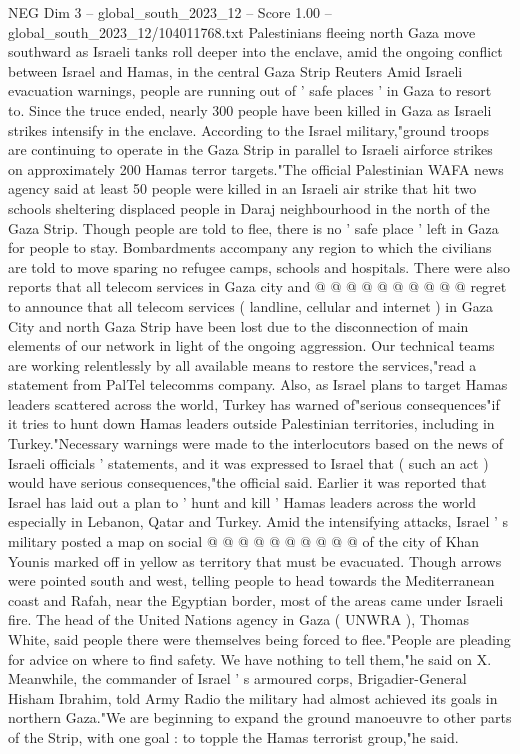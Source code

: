 \begin{textsample}{NEG Dim 3 – global\_south\_2023\_12 – Score 1.00 – global\_south\_2023\_12/104011768.txt}  \label{ex:f3_neg_014}
Palestinians fleeing north Gaza move southward as Israeli tanks roll deeper into the enclave, amid the ongoing conflict between Israel and Hamas, in the central Gaza Strip Reuters Amid Israeli evacuation warnings, people are running out of ' safe places ' in Gaza to resort to.
Since the truce ended, nearly 300 people have been killed in Gaza as Israeli strikes intensify in the enclave.
According to the Israel military,"ground troops are continuing to operate in the Gaza Strip in parallel to Israeli airforce strikes on approximately 200 Hamas terror targets."The official Palestinian WAFA news agency said at least 50 people were killed in an Israeli air strike that hit two schools sheltering displaced people in Daraj neighbourhood in the north of the Gaza Strip.
Though people are told to flee, there is no ' safe place ' left in Gaza for people to stay.
Bombardments accompany any region to which the civilians are told to move sparing no refugee camps, schools and hospitals.
There were also reports that all telecom services in Gaza city and @ @ @ @ @ @ @ @ @ @ regret to announce that all telecom services ( landline, cellular and internet ) in Gaza City and north Gaza Strip have been lost due to the disconnection of main elements of our network in light of the ongoing aggression.
Our technical teams are working relentlessly by all available means to restore the services,"read a statement from PalTel telecomms company.
Also, as Israel plans to target Hamas leaders scattered across the world, Turkey has warned of"serious consequences"if it tries to hunt down Hamas leaders outside Palestinian territories, including in Turkey."Necessary warnings were made to the interlocutors based on the news of Israeli officials ' statements, and it was expressed to Israel that ( such an act ) would have serious consequences,"the official said.
Earlier it was reported that Israel has laid out a plan to ' hunt and kill ' Hamas leaders across the world especially in Lebanon, Qatar and Turkey.
Amid the intensifying attacks, Israel ' s military posted a map on social @ @ @ @ @ @ @ @ @ @ of the city of Khan Younis marked off in yellow as territory that must be evacuated.
Though arrows were pointed south and west, telling people to head towards the Mediterranean coast and Rafah, near the Egyptian border, most of the areas came under Israeli fire.
The head of the United Nations agency in Gaza ( UNWRA ), Thomas White, said people there were themselves being forced to flee."People are pleading for advice on where to find safety.
We have nothing to tell them,"he said on X.
Meanwhile, the commander of Israel ' s armoured corps, Brigadier-General Hisham Ibrahim, told Army Radio the military had almost achieved its goals in northern Gaza."We are beginning to expand the ground manoeuvre to other parts of the Strip, with one goal : to topple the Hamas terrorist group,"he said.

\end{textsample}
